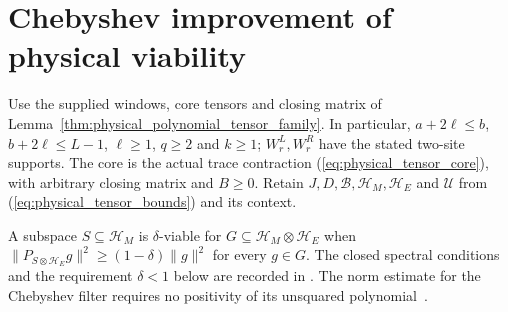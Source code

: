 \section{Chebyshev improvement of physical viability}

Use the supplied windows, core tensors and closing matrix of
Lemma~\ref{thm:physical_polynomial_tensor_family}. In particular,
$a+2\ell\le b$, $b+2\ell\le L-1$, $\ell\ge1$, $q\ge2$ and $k\ge1$;
$W^L_r,W^R_r$ have the stated two-site supports. The core is the actual trace
contraction (\ref{eq:physical_tensor_core}), with arbitrary closing matrix
and $B\ge0$. Retain $J,D,\mathcal B,\mathcal H_M,\mathcal H_E$ and
$\mathcal U$ from (\ref{eq:physical_tensor_bounds}) and its context.

A subspace $S\subseteq\mathcal H_M$ is $\delta$-viable for
$G\subseteq\mathcal H_M\otimes\mathcal H_E$ when
$\|P_{S\otimes\mathcal H_E}g\|^2\ge(1-\delta)\|g\|^2$ for every $g\in G$.
The closed spectral conditions and the requirement $\delta<1$ below are
recorded in \cite{gap:alvv16_spectral_projector_boundary}.
The norm estimate for the Chebyshev filter requires no positivity of its
unsquared polynomial~\cite{gap:alvv16_chebyshev_filter_positivity}.

